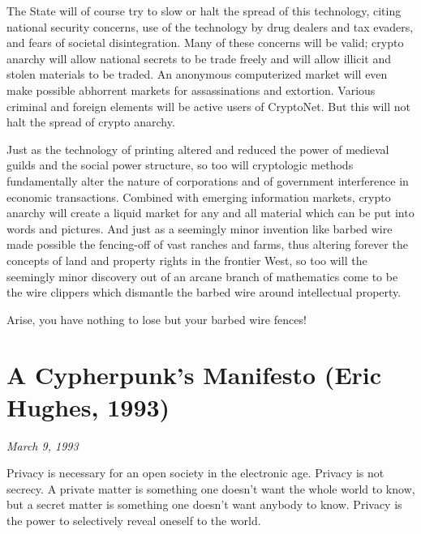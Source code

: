 \documentclass[letterpaper,12pt,english]{sphinxmanual}
\begin{document}
The State will of course try to slow or halt the spread of this technology, citing national security concerns, use of the technology by drug dealers and tax evaders, and fears of societal disintegration. Many of these concerns will be valid; crypto anarchy will allow national secrets to be trade freely and will allow illicit and stolen materials to be traded. An anonymous computerized market will even make possible abhorrent markets for assassinations and extortion. Various criminal and foreign elements will be active users of CryptoNet. But this will not halt the spread of crypto anarchy.

Just as the technology of printing altered and reduced the power of medieval guilds and the social power structure, so too will cryptologic methods fundamentally alter the nature of corporations and of government interference in economic transactions. Combined with emerging information markets, crypto anarchy will create a liquid market for any and all material which can be put into words and pictures. And just as a seemingly minor invention like barbed wire made possible the fencing-off of vast ranches and farms, thus altering forever the concepts of land and property rights in the frontier West, so too will the seemingly minor discovery out of an arcane branch of mathematics come to be the wire clippers which dismantle the barbed wire around intellectual property.

Arise, you have nothing to lose but your barbed wire fences!


\chapter{A Cypherpunk's Manifesto (Eric Hughes, 1993)}
\label{1993::doc}\label{1993:a-cypherpunk-s-manifesto-eric-hughes-1993}\label{1993:index-0}
\emph{March 9, 1993}

Privacy is necessary for an open society in the electronic age. Privacy is not secrecy. A private matter is something one doesn't want the whole world to know, but a secret matter is something one doesn't want anybody to know. Privacy is the power to selectively reveal oneself to the world.
\end{document}
